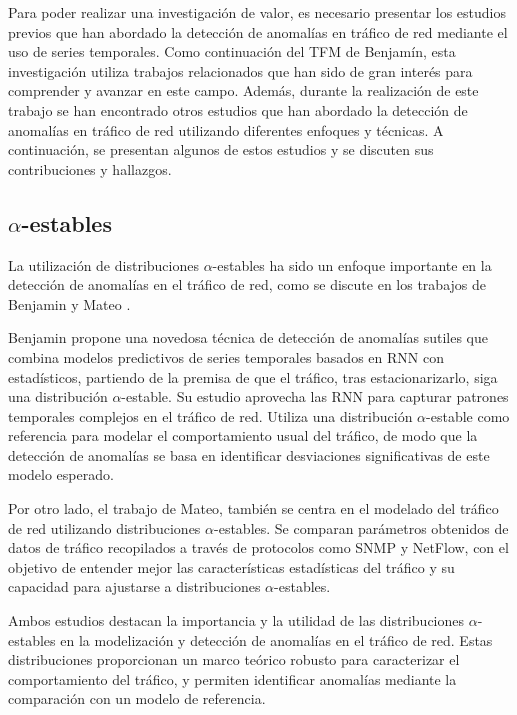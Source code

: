 Para poder realizar una investigación de valor, es necesario presentar los estudios previos que han abordado la detección de anomalías en tráfico de red mediante el uso de series temporales. Como continuación del \ac{TFM} de Benjamín, esta investigación utiliza trabajos relacionados que han sido de gran interés para comprender y avanzar en este campo. Además, durante la realización de este trabajo se han encontrado otros estudios que han abordado la detección de anomalías en tráfico de red utilizando diferentes enfoques y técnicas. A continuación, se presentan algunos de estos estudios y se discuten sus contribuciones y hallazgos.

\subsection{$\alpha$-estables} %
La utilización de distribuciones $\alpha$-estables ha sido un enfoque importante en la detección de anomalías en el tráfico de red, como se discute en los trabajos de Benjamin \cite{benjamin2023} y Mateo \cite{mateo2013}.

Benjamin propone una novedosa técnica de detección de anomalías sutiles que combina modelos predictivos de series temporales basados en \ac{RNN} con estadísticos, partiendo de la premisa de que el tráfico, tras estacionarizarlo, siga una distribución $\alpha$-estable.
Su estudio aprovecha las \ac{RNN} para capturar patrones temporales complejos en el tráfico de red. Utiliza una distribución $\alpha$-estable como referencia para modelar el comportamiento usual del tráfico, de modo que la detección de anomalías se basa en identificar desviaciones significativas de este modelo esperado.

Por otro lado, el trabajo de Mateo, también se centra en el modelado del tráfico de red utilizando distribuciones $\alpha$-estables. Se comparan parámetros obtenidos de datos de tráfico recopilados a través de protocolos como SNMP y NetFlow, con el objetivo de entender mejor las características estadísticas del tráfico y su capacidad para ajustarse a distribuciones $\alpha$-estables.

Ambos estudios destacan la importancia y la utilidad de las distribuciones $\alpha$-estables en la modelización y detección de anomalías en el tráfico de red. Estas distribuciones proporcionan un marco teórico robusto para caracterizar el comportamiento del tráfico, y permiten identificar anomalías mediante la comparación con un modelo de referencia.

